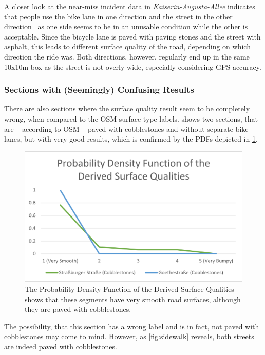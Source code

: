 A closer look at the near-miss incident data in \textit{Kaiserin-Augusta-Allee} indicates that people use the bike lane in one direction and the street in the other direction~\cite{dataset_simra_set1,dataset_simra_set2,dataset_simra_set3} as one side seems to be in an unusable condition while the other is acceptable.
Since the bicycle lane is paved with paving stones and the street with asphalt, this leads to different surface quality of the road, depending on which direction the ride was.
Both directions, however, regularly end up in the same 10x10m box as the street is not overly wide, especially considering GPS accuracy.

\subsubsection{Sections with (Seemingly) Confusing Results}
\label{subsubsec:sections_with_seemingly_confusing_results}
There are also sections where the surface quality result seem to be completely wrong, when compared to the OSM surface type labels.
 shows two sections, that are -- according to OSM -- paved with cobblestones and without separate bike lanes, but with very good results, which is confirmed by the PDFs depicted in \cref{fig:mismatched}.

\begin{figure}
    \centering
    \includegraphics[width=\columnwidth]{fig/pdf_mismatched.png}
    \caption{%
        The Probability Density Function of the Derived Surface Qualities shows that these segments have very smooth road surfaces, although they are paved with cobblestones.
    }%
    \label{fig:mismatched}
\end{figure}

The possibility, that this section has a wrong label and is in fact, not paved with cobblestones may come to mind.
However, as \cref{fig:sidewalk} reveals, both streets are indeed paved with cobblestones.


